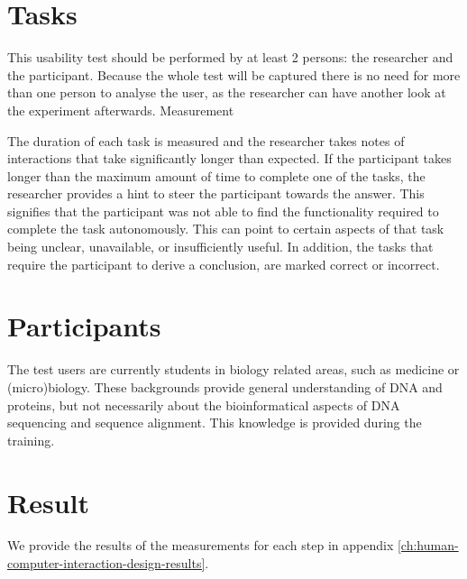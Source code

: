 \section{Tasks}
This usability test should be performed by at least 2 persons: the researcher and the participant. Because the whole test will be captured there is no need for more than one person to analyse the user, as the researcher can have another look at the experiment afterwards.
Measurement
\par
The duration of each task is measured and the researcher takes notes of interactions that take significantly longer than expected. If the participant takes longer than the maximum amount of time to complete one of the tasks, the researcher provides a hint to steer the participant towards the answer. This signifies that the participant was not able to find the functionality required to complete the task autonomously. This can point to certain aspects of that task being unclear, unavailable, or insufficiently useful.
In addition, the tasks that require the participant to derive a conclusion, are marked correct or incorrect.

\section{Participants}
The test users are currently students in biology related areas, such as medicine or (micro)biology. These backgrounds provide general understanding of DNA and proteins, but not necessarily about the bioinformatical aspects of DNA sequencing and sequence alignment. This knowledge is provided during the training.
\section{Result}
We provide the results of the measurements for each step in appendix \ref{ch:human-computer-interaction-design-results}. 
